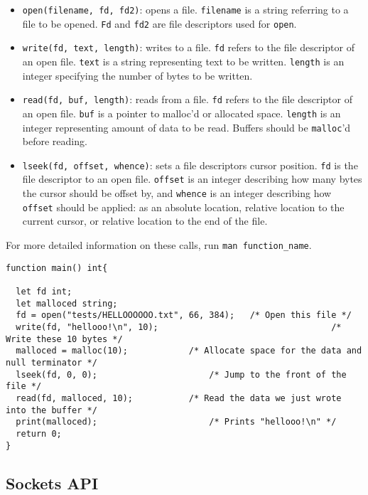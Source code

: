 		\begin{itemize}
			\item \texttt{open(filename, fd, fd2)}: opens a file. \texttt{filename} is a string referring to a file to be opened. \texttt{Fd} and \texttt{fd2} are file descriptors used for \texttt{open}.
			\item \texttt{write(fd, text, length)}: writes to a file. \texttt{fd} refers to the file descriptor of an open file. \texttt{text} is a string representing text to be written. \texttt{length} is an integer specifying the number of bytes to be written.
			\item \texttt{read(fd, buf, length)}: reads from a file. \texttt{fd} refers to the file descriptor of an open file. \texttt{buf} is a pointer to malloc'd or allocated space. \texttt{length} is an integer representing amount of data to be read. Buffers should be \texttt{malloc}'d before reading. 
			\item \texttt{lseek(fd, offset, whence)}: sets a file descriptors cursor position. \texttt{fd} is the file descriptor to an open file. \texttt{offset} is an integer describing how many bytes the cursor should be offset by, and \texttt{whence} is an integer describing how \texttt{offset} should be applied: as an absolute location, relative location to the current cursor, or relative location to the end of the file.
		\end{itemize}

		\noindent
		For more detailed information on these calls, run \texttt{man function\_name}.

		\begin{lstlisting}
function main() int{

  let fd int;
  let malloced string;
  fd = open("tests/HELLOOOOOO.txt", 66, 384); 	/* Open this file */
  write(fd, "hellooo!\n", 10); 									/* Write these 10 bytes */
  malloced = malloc(10); 			/* Allocate space for the data and null terminator */
  lseek(fd, 0, 0);						/* Jump to the front of the file */
  read(fd, malloced, 10);			/* Read the data we just wrote into the buffer */
  print(malloced);						/* Prints "hellooo!\n" */
  return 0;
}
		\end{lstlisting}

	\subsection{Sockets API}
